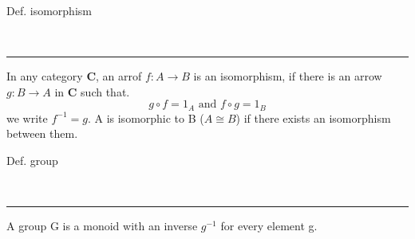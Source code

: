 \begin{note}
  \begin{field}
    Def. isomorphism
  \end{field} \\
  \noindent\rule[0.5ex]{\linewidth}{1pt}
  \begin{field}
    In any category \textbf{C}, an arrof $f: A\rightarrow B$ is an isomorphism, if there is an arrow $g: B\rightarrow A$ in \textbf{C} such that.
    \[ g\circ f = 1_A\text{ and }f\circ g = 1_B \]
    we write $f^{-1} = g$.
    A is isomorphic to B ($A\cong B$) if there exists an isomorphism between them.
  \end{field}
\end{note}

\begin{note}
  \begin{field}
    Def. group
  \end{field} \\
  \noindent\rule[0.5ex]{\linewidth}{1pt}
  \begin{field}
    A group G is a monoid with an inverse $g^{-1}$ for every element g.
  \end{field}
\end{note}
















